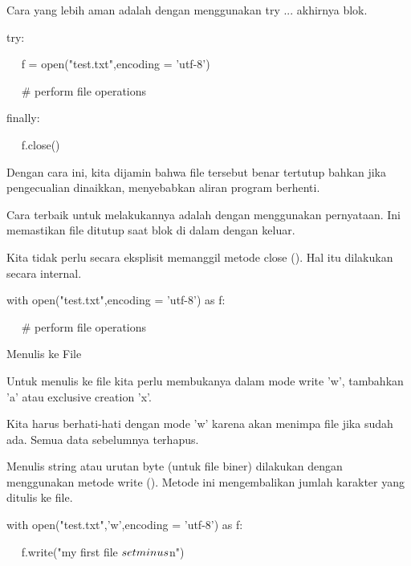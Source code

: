 \vspace{12pt}
Cara yang lebih aman adalah dengan menggunakan try ... akhirnya blok. \par
\vspace{12pt}
try: \par
~~ f = open("test.txt",encoding = 'utf-8') \par
~~  $  \#  $ perform file operations \par
finally: \par
~~ f.close() \par
\vspace{12pt}
Dengan cara ini, kita dijamin bahwa file tersebut benar tertutup bahkan jika pengecualian dinaikkan, menyebabkan aliran program berhenti. \par
\vspace{12pt}
Cara terbaik untuk melakukannya adalah dengan menggunakan pernyataan. Ini memastikan file ditutup saat blok di dalam dengan keluar. \par
\vspace{12pt}
Kita tidak perlu secara eksplisit memanggil metode close (). Hal itu dilakukan secara internal. \par
\vspace{12pt}
with open("test.txt",encoding = 'utf-8') as f: \par
~~  $  \#  $ perform file operations \par
\vspace{12pt}
\vspace{12pt}
\vspace{12pt}
\vspace{12pt}
Menulis ke File \par
\vspace{12pt}
Untuk menulis ke file kita perlu membukanya dalam mode write 'w', tambahkan 'a' atau exclusive creation 'x'. \par
\vspace{12pt}
Kita harus berhati-hati dengan mode 'w' karena akan menimpa file jika sudah ada. Semua data sebelumnya terhapus. \par
\vspace{12pt}
Menulis string atau urutan byte (untuk file biner) dilakukan dengan menggunakan metode write (). Metode ini mengembalikan jumlah karakter yang ditulis ke file. \par
\vspace{12pt}
with open("test.txt",'w',encoding = 'utf-8') as f: \par
~~ f.write("my first file $  \\setminus  $n") \par
